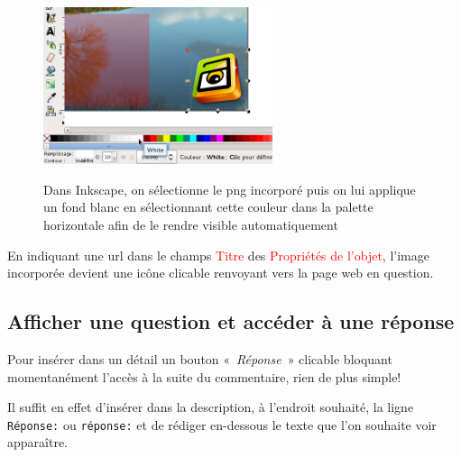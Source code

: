 \documentclass[a4paper,12pt]{report}
\newcommand{\chemin}[1]{\textcolor{red}{#1}}
\begin{document}
\begin{figure}[htp]
 \centering
 \caption{Dans Inkscape, on sélectionne le png incorporé puis on lui applique un fond blanc en sélectionnant cette couleur dans la palette horizontale afin de le rendre visible automatiquement}
 \includegraphics[width=0.6\textwidth]{images/remplissage_blanc}
 \label{remplissage_blanc}
\end{figure}

En indiquant une url dans le champs \chemin{Titre} des \chemin{Propriétés de l'objet}, l'image incorporée
devient une icône clicable renvoyant vers la page web en question.

\subsection{Afficher une question et accéder à une réponse}

Pour insérer dans un détail un bouton «~\textit{Réponse}~» clicable bloquant momentanément l'accès à la suite du commentaire,
rien de plus simple!

Il suffit en effet d'insérer dans la description, à l'endroit souhaité, la ligne\\
\verb|Réponse:| ou \verb|réponse:| et de rédiger en-dessous le texte que l'on souhaite voir apparaître.
\end{document}
